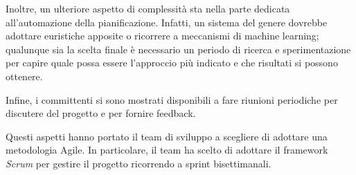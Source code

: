 Inoltre, un ulteriore aspetto di complessità sta nella parte dedicata all'automazione della pianificazione. Infatti, un sistema del genere dovrebbe adottare euristiche apposite o ricorrere a meccanismi di machine learning; qualunque sia la scelta finale è necessario un periodo di ricerca e sperimentazione per capire quale possa essere l'approccio più indicato e che risultati si possono ottenere. 

Infine, i committenti si sono mostrati disponibili a fare riunioni periodiche per discutere del progetto e per fornire feedback. 

Questi aspetti hanno portato il team di sviluppo a scegliere di adottare una metodologia Agile. In particolare, il team ha scelto di adottare il framework \emph{Scrum} per gestire il progetto ricorrendo a sprint bisettimanali.
